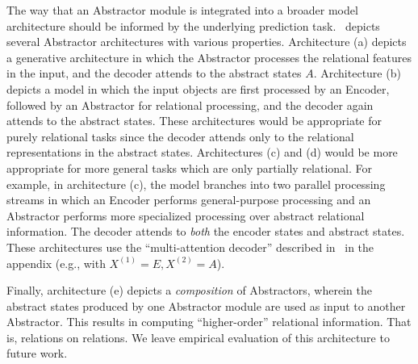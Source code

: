 The way that an Abstractor module is integrated into a broader model architecture should be informed by the underlying prediction task.~ depicts several Abstractor architectures with various properties. Architecture (a) depicts a generative architecture in which the Abstractor processes the relational features in the input, and the decoder attends to the abstract states $A$. Architecture (b) depicts a model in which the input objects are first processed by an Encoder, followed by an Abstractor for relational processing, and the decoder again attends to the abstract states. These architectures would be appropriate for purely relational tasks since the decoder attends only to the relational representations in the abstract states. Architectures (c) and (d) would be more appropriate for more general tasks which are only partially relational. For example, in architecture (c), the model branches into two parallel processing streams in which an Encoder performs general-purpose processing and an Abstractor performs more specialized processing over abstract relational information. The decoder attends to \textit{both} the encoder states and abstract states.
These architectures use the ``multi-attention decoder'' described in~ in the appendix (e.g., with $X^{(1)} = E, X^{(2)} = A$).

Finally, architecture (e) depicts a \textit{composition} of Abstractors, wherein the abstract states produced by one Abstractor module are used as input to another Abstractor. This results in computing ``higher-order'' relational information. That is, relations on relations.
We leave empirical evaluation of this architecture to future work.
